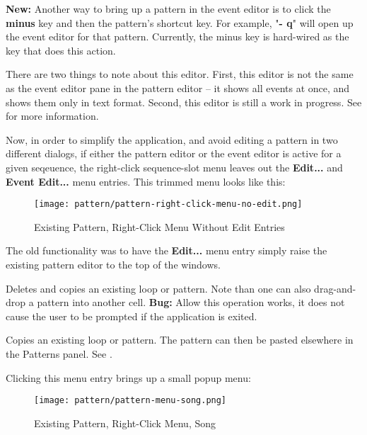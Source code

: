    \textbf{New:}
   Another way to bring up a pattern in the event editor is to
   click the \textbf{minus} key and then the pattern's shortcut key.
   For example, "\textbf{- q}" will open up the event editor for that pattern.
   Currently, the minus key is hard-wired as the key that does this action.

   There are two things to note about this editor.
   First, this editor is not the same as the event editor pane in the pattern
   editor -- it shows all events at once, and shows them only in text format.
   Second, this editor is still a work in progress.
   See  for more information.

   Now, in order to simplify the application, and avoid editing a pattern in
   two different dialogs, if either the pattern editor or the event editor is
   active for a given seqeuence, the right-click sequence-slot menu leaves out
   the \textbf{Edit...} and \textbf{Event Edit...} menu entries.
   This trimmed menu looks like this:

\begin{figure}[H]
   \centering 
   \texttt{[image: pattern/pattern-right-click-menu-no-edit.png]}
   \caption{Existing Pattern, Right-Click Menu Without Edit Entries}
   \label{fig:pattern_window_right_click_no_edit}
\end{figure}

   The old functionality was to have the \textbf{Edit...} menu entry simply
   raise the existing pattern editor to the top of the windows.

   Deletes and copies an existing loop or pattern.
   Note than one can also drag-and-drop a pattern into another cell.
   \textbf{Bug:}
   Allow this operation works, it does not cause the user to be prompted if the
   application is exited.

   Copies an existing loop or pattern.
   The pattern can then be pasted elsewhere in the Patterns panel.
   See .

   Clicking this menu entry brings up a small popup menu:

\begin{figure}[H]
   \centering 
   \texttt{[image: pattern/pattern-menu-song.png]}
   \caption{Existing Pattern, Right-Click Menu, Song}
   \label{fig:pattern_window_right_click_song}
\end{figure}

